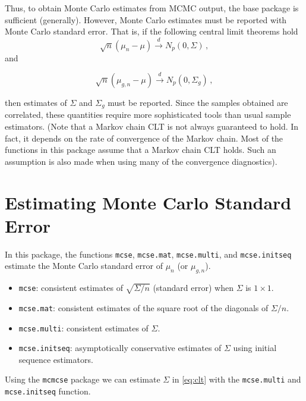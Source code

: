 \documentclass[11pt]{article}\usepackage[]{graphicx}\usepackage[]{color}
\begin{document}
Thus, to obtain Monte Carlo estimates from MCMC output, the base package is sufficient (generally). However, Monte Carlo estimates must be reported with Monte Carlo standard error. That is, if the following central limit theorems hold
\begin{equation}
\label{eq:clt}
\sqrt{n}(\mu_n - \mu) \overset{d}{\to} N_p(0, \Sigma)\,,
\end{equation}
and

\begin{equation}
\label{eq:g_clt}
\sqrt{n}(\mu_{g,n} - \mu) \overset{d}{\to} N_p(0, \Sigma_g)\,,
\end{equation}

then estimates of $\Sigma$ and $\Sigma_g$ must be reported. Since the samples obtained are correlated, these quantities require more sophisticated tools than usual sample estimators.
(Note that a Markov chain CLT is not always guaranteed to hold. In fact, it depends on the rate of convergence of the Markov chain. Most of the functions in this package assume that a Markov chain CLT holds. Such an assumption is also made when using many of the convergence diagnostics).

\section{Estimating Monte Carlo Standard Error}
In this package, the functions \texttt{mcse}, \texttt{mcse.mat}, \texttt{mcse.multi}, and \texttt{mcse.initseq} estimate the Monte Carlo standard error of $\mu_n$ (or $\mu_{g,n}$).
\begin{itemize}
\item \texttt{mcse}: consistent estimates of $\sqrt{\Sigma/n}$ (standard error) when $\Sigma$ is $1 \times 1$. 
\item \texttt{mcse.mat}: consistent estimates of the square root of the  diagonals of $\Sigma/n$.
\item \texttt{mcse.multi}: consistent estimates of $\Sigma$.
\item \texttt{mcse.initseq}: asymptotically conservative estimates of $\Sigma$ using initial sequence estimators.
\end{itemize}

Using the \texttt{mcmcse} package we can estimate $\Sigma$ in \eqref{eq:clt} with the \texttt{mcse.multi} and \texttt{mcse.initseq} function. 
\end{document}
